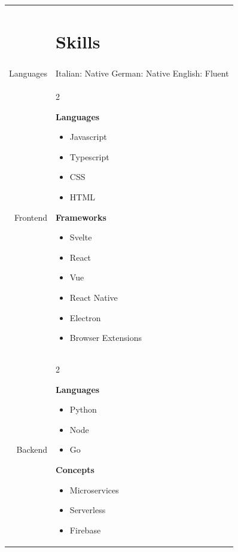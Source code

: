 \documentclass[letterpaper,10pt]{article}
\newcommand{\headingfont}{\Large\color{accent}\BluuNext}
\newenvironment{compactlist}{
  \begin{itemize}[noitemsep,nolistsep,partopsep=-20pt,topsep=-20pt,leftmargin=0pt, label=--]
      }{
  \end{itemize}
}
\newenvironment{lr}{
  \setlength\multicolsep{-1.7em}
  \begin{multicols}{2}
}{
  \end{multicols}
}
\newenvironment{SectionTable}[1]{
	\renewcommand*{\arraystretch}{1.7}
	\setlength{\tabcolsep}{10pt}
	\begin{longtable}{Rp{5.2in}} & #1 \\}
{\end{longtable}\vspace{-.3cm}}
\begin{document}
\begin{SectionTable}{\headingfont \section{Skills}}

  Languages &
  Italian: Native \newline
  German: Native \newline
  English: Fluent \newline
  \\

  Frontend &
  \begin{lr}
    \textbf{Languages}
    \begin{compactlist}
      \item Javascript
      \item Typescript
      \item CSS
      \item HTML
    \end{compactlist}

    \columnbreak

    \textbf{Frameworks}
    \begin{compactlist}
      \item Svelte
      \item React
      \item Vue
      \item React Native
      \item Electron
      \item Browser Extensions
    \end{compactlist}
  \end{lr}
  \\

  Backend &
  \begin{lr}
    \textbf{Languages}
    \begin{compactlist}
      \item Python
      \item Node
      \item Go
    \end{compactlist}
    \columnbreak
    \textbf{Concepts}
    \begin{compactlist}
      \item Microservices
      \item Serverless
      \item Firebase
    \end{compactlist}
  \end{lr}
  \\


\end{SectionTable}
\end{document}
